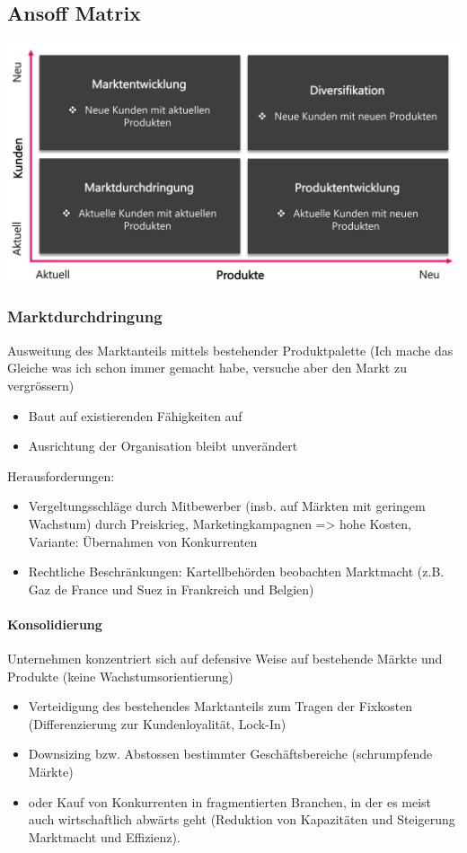 \subsection{Ansoff Matrix}
\includegraphics[width=0.5\linewidth]{images/ansoff}

\subsubsection{Marktdurchdringung}
Ausweitung des Marktanteils mittels bestehender Produktpalette (Ich mache das Gleiche was ich schon immer gemacht habe, versuche aber den Markt zu vergrössern)
\begin{itemize}
	\item Baut auf existierenden Fähigkeiten auf
	\item Ausrichtung der Organisation bleibt unverändert
\end{itemize}
Herausforderungen:
\begin{itemize}
	\item Vergeltungsschläge durch Mitbewerber (insb. auf Märkten mit geringem Wachstum) durch Preiskrieg, Marketingkampagnen => hohe Kosten, Variante: Übernahmen von Konkurrenten
	\item Rechtliche Beschränkungen: Kartellbehörden beobachten Marktmacht (z.B. Gaz de France und Suez in Frankreich und Belgien)
\end{itemize}

\paragraph{Konsolidierung}
Unternehmen konzentriert sich auf defensive Weise auf bestehende Märkte und Produkte (keine Wachstumsorientierung)
\begin{itemize}
	\item Verteidigung des bestehendes Marktanteils zum Tragen der Fixkosten (Differenzierung zur Kundenloyalität, Lock-In)
	\item Downsizing bzw. Abstossen bestimmter Geschäftsbereiche (schrumpfende Märkte)
	\item oder Kauf von Konkurrenten in fragmentierten Branchen, in der es meist auch wirtschaftlich abwärts geht (Reduktion von Kapazitäten und Steigerung Marktmacht und Effizienz).
\end{itemize}

